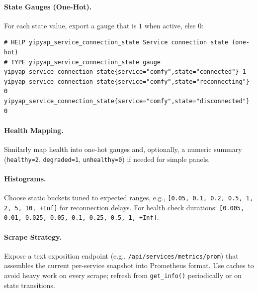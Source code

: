 \documentclass[11pt]{article}
\begin{document}
\paragraph{State Gauges (One-Hot).} For each state value, export a gauge that is \(1\) when active, else \(0\):
\begin{verbatim}
# HELP yipyap_service_connection_state Service connection state (one-hot)
# TYPE yipyap_service_connection_state gauge
yipyap_service_connection_state{service="comfy",state="connected"} 1
yipyap_service_connection_state{service="comfy",state="reconnecting"} 0
yipyap_service_connection_state{service="comfy",state="disconnected"} 0
\end{verbatim}

\paragraph{Health Mapping.} Similarly map health into one-hot gauges and, optionally, a numeric summary (\texttt{healthy=2}, \texttt{degraded=1}, \texttt{unhealthy=0}) if needed for simple panels.

\paragraph{Histograms.} Choose static buckets tuned to expected ranges, e.g., \texttt{[0.05, 0.1, 0.2, 0.5, 1, 2, 5, 10, +Inf]} for reconnection delays. For health check durations: \texttt{[0.005, 0.01, 0.025, 0.05, 0.1, 0.25, 0.5, 1, +Inf]}.

\paragraph{Scrape Strategy.} Expose a text exposition endpoint (e.g., \texttt{/api/services/metrics/prom}) that assembles the current per-service snapshot into Prometheus format. Use caches to avoid heavy work on every scrape; refresh from \texttt{get\_info()} periodically or on state transitions.
\end{document}

